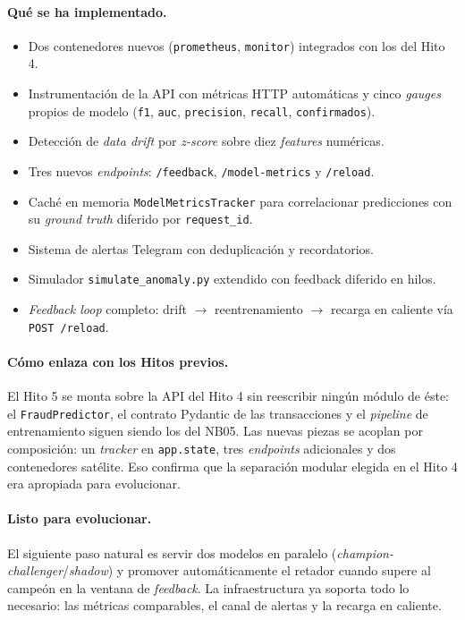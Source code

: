 \documentclass[12pt,a4paper]{report}
\begin{document}
\paragraph{Qué se ha implementado.}
\begin{itemize}
    \item Dos contenedores nuevos (\texttt{prometheus}, \texttt{monitor}) integrados con los del Hito 4.
    \item Instrumentación de la API con métricas HTTP automáticas y cinco \textit{gauges} propios de modelo (\texttt{f1}, \texttt{auc}, \texttt{precision}, \texttt{recall}, \texttt{confirmados}).
    \item Detección de \textit{data drift} por \textit{z-score} sobre diez \textit{features} numéricas.
    \item Tres nuevos \textit{endpoints}: \texttt{/feedback}, \texttt{/model-metrics} y \texttt{/reload}.
    \item Caché en memoria \texttt{ModelMetricsTracker} para correlacionar predicciones con su \textit{ground truth} diferido por \texttt{request\_id}.
    \item Sistema de alertas Telegram con deduplicación y recordatorios.
    \item Simulador \texttt{simulate\_anomaly.py} extendido con feedback diferido en hilos.
    \item \textit{Feedback loop} completo: drift $\rightarrow$ reentrenamiento $\rightarrow$ recarga en caliente vía \texttt{POST /reload}.
\end{itemize}

\paragraph{Cómo enlaza con los Hitos previos.} El Hito 5 se monta sobre la API del Hito 4 sin reescribir ningún módulo de éste: el \texttt{FraudPredictor}, el contrato Pydantic de las transacciones y el \textit{pipeline} de entrenamiento siguen siendo los del NB05. Las nuevas piezas se acoplan por composición: un \textit{tracker} en \texttt{app.state}, tres \textit{endpoints} adicionales y dos contenedores satélite. Eso confirma que la separación modular elegida en el Hito 4 era apropiada para evolucionar.

\paragraph{Listo para evolucionar.} El siguiente paso natural es servir dos modelos en paralelo (\textit{champion-challenger}/\textit{shadow}) y promover automáticamente el retador cuando supere al campeón en la ventana de \textit{feedback}. La infraestructura ya soporta todo lo necesario: las métricas comparables, el canal de alertas y la recarga en caliente.
\end{document}
